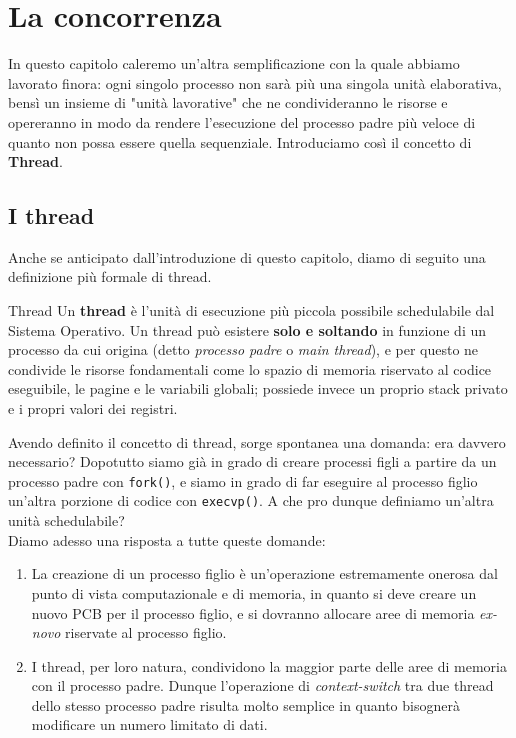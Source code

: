 \documentclass[12pt]{report}
\begin{document}
	\chapter{La concorrenza}
	In questo capitolo caleremo un'altra semplificazione con la quale abbiamo lavorato finora: ogni singolo processo non sarà più una singola unità elaborativa, bensì un insieme di "unità lavorative" che ne condivideranno le risorse e opereranno in modo da rendere l'esecuzione del processo padre più veloce di quanto non possa essere quella sequenziale. Introduciamo così il concetto di \textbf{Thread}.
	
	\section{I thread}
	Anche se anticipato dall'introduzione di questo capitolo, diamo di seguito una definizione più formale di thread.
	\begin{definizione}{Thread}{}
		Un \textbf{thread} è l'unità di esecuzione più piccola possibile schedulabile dal Sistema Operativo. Un thread può esistere \textbf{solo e soltando} in funzione di un processo da cui origina (detto \textit{processo padre} o \textit{main thread}), e per questo ne condivide le risorse fondamentali come lo spazio di memoria riservato al codice eseguibile, le pagine e le variabili globali; possiede invece un proprio stack privato e i propri valori dei registri.
	\end{definizione}
	Avendo definito il concetto di thread, sorge spontanea una domanda: era davvero necessario? Dopotutto siamo già in grado di creare processi figli a partire da un processo padre con \texttt{fork()}, e siamo in grado di far eseguire al processo figlio un'altra porzione di codice con \texttt{execvp()}. A che pro dunque definiamo un'altra unità schedulabile?\\
	Diamo adesso una risposta a tutte queste domande:
	\begin{enumerate}
		\item La creazione di un processo figlio è un'operazione estremamente onerosa dal punto di vista computazionale e di memoria, in quanto si deve creare un nuovo PCB per il processo figlio, e si dovranno allocare aree di memoria \textit{ex-novo} riservate al processo figlio.
		
		\item I thread, per loro natura, condividono la maggior parte delle aree di memoria con il processo padre. Dunque l'operazione di \textit{context-switch} tra due thread dello stesso processo padre risulta molto semplice in quanto bisognerà modificare un numero limitato di dati.
	\end{enumerate}
	
\end{document}
